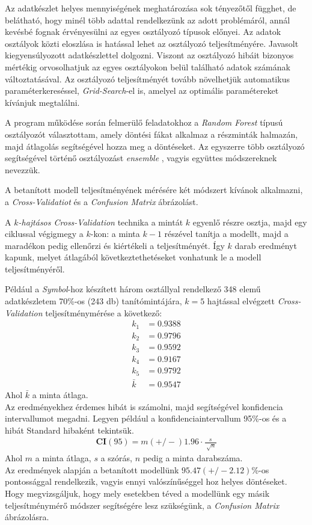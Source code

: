 Az adatkészlet helyes mennyiségének meghatározása sok tényezőtől függhet, de belátható, hogy minél több adattal rendelkezünk az adott problémáról, annál kevésbé fognak érvényesülni az egyes osztályozó típusok előnyei. \cite{geron2019hands} Az adatok osztályok közti eloszlása is hatással lehet az osztályozó teljesítményére. Javasolt kiegyensúlyozott adatkészlettel dolgozni. Viszont az osztályozó hibáit bizonyos mértékig orvosolhatjuk az egyes osztályokon belül található adatok számának változtatásával. Az osztályozó teljesítményét tovább növelhetjük automatikus paraméterkereséssel, \textit{Grid-Search}-el is, amelyel az optimális paramétereket kívánjuk megtalálni. \cite{koesmarno2019class}

A program működése során felmerülő feladatokhoz a \textit{Random Forest} típusú osztályozót választottam, amely döntési fákat alkalmaz a részminták halmazán, majd átlagolás segítségével hozza meg a döntéseket. Az egyszerre több osztályozó segítségével történő osztályozást \textit{ensemble} \cite{geron2019hands}, vagyis együttes módszereknek nevezzük.

A betanított modell teljesítményének mérésére két módszert kívánok alkalmazni, a \textit{Cross-Validatiot} és a \textit{Confusion Matrix} ábrázolást.


A \textit{$k$-hajtásos Cross-Validation} technika a mintát $k$ egyenlő részre osztja, majd egy ciklussal végigmegy a $k$-kon: a minta $k-1$ részével tanítja a modellt, majd a maradékon pedig ellenőrzi és kiértékeli a teljesítményét. Így $k$ darab eredményt kapunk, melyet átlagából következtethetéseket vonhatunk le a modell teljesítményéről.

Például a \textit{Symbol}-hoz készített három osztállyal rendelkező 348 elemű adatkészletem 70\%-os (243 db) tanítómintájára, $k=5$ hajtással elvégzett \textit{Cross-Validation} teljesítménymérése a következő:
\begin{align*}
	k_1 &= 0.9388\\
	k_2 &= 0.9796\\
	k_3 &= 0.9592\\
	k_4 &= 0.9167\\
	k_5 &= 0.9792\\
	\bar{k} &= 0.9547
\end{align*}
Ahol $\bar{k}$ a minta átlaga.\\
Az eredményekhez érdemes hibát is számolni, majd segítségével konfidencia intervallumot megadni. Legyen például a konfidenciaintervallum 95\%-os és a hibát Standard hibaként tekintsük.
\begin{align*}
	\boldsymbol{CI}(95) = m (+/-) 1.96 \cdot \frac{s}{\sqrt[]{n}}
\end{align*}
Ahol $m$ a minta átlaga, $s$ a szórás, $n$ pedig a minta darabszáma.\\
Az eredmények alapján a betanított modellünk $95.47 (+/- 2.12)$\%-os pontossággal rendelkezik, vagyis ennyi valószínűséggel hoz helyes döntéseket. Hogy megvizsgáljuk, hogy mely esetekben téved a modellünk egy másik teljesítménymérő módszer segítségére lesz szükségünk, a \textit{Confusion Matrix} ábrázolásra.

